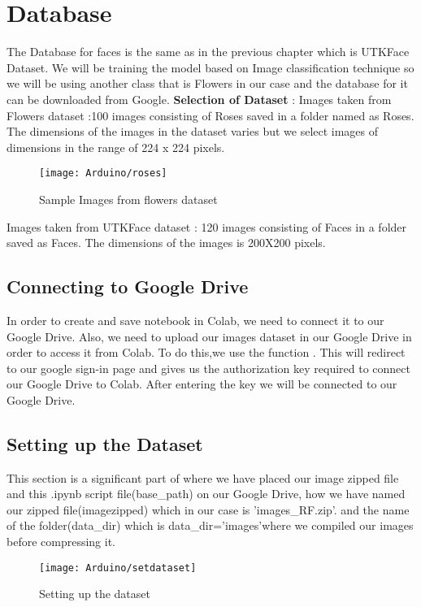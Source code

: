 	\section{Database}
	The Database for faces is the same as in the previous chapter which is UTKFace Dataset. We will be training the model based on Image classification technique so we will be using another class that is Flowers in our case and the database for it can be downloaded from Google.
	\textbf{Selection of Dataset} : Images taken from Flowers dataset :100 images consisting of Roses saved in a folder named as Roses. The dimensions of the images in the dataset varies but we select images of dimensions in the range of 224 x 224 pixels. 
	\begin{figure}[H]
		\centering
		\texttt{[image: Arduino/roses]}
		\caption{Sample Images from flowers dataset}
		\label{figure 10.1}
	\end{figure}
	Images taken from UTKFace dataset : 120 images consisting of Faces in a folder saved as Faces. The dimensions of the images is 200X200 pixels.
	\subsection{Connecting to Google Drive}
	In order to create and save notebook in Colab, we need to connect it to our Google Drive. Also, we need to upload our images dataset in our Google Drive in order to access it from Colab. To do this,we use the function . This will redirect to our google sign-in page and gives us the authorization key required to connect our Google Drive to Colab. After entering the key we will be connected to our Google Drive.
	
	
	
	\subsection{Setting up the Dataset}
	This section  is a significant part of where we have placed our image zipped file and this .ipynb script file(base\_path) on our Google Drive, how we have named our zipped file(imagezipped) which in our case is 'images\_RF.zip'. and the name of the folder(data\_dir) which is data\_dir='images'where we compiled our images before compressing it.
	\begin{figure}[H]
		\centering
		\texttt{[image: Arduino/setdataset]}
		\caption{Setting up the dataset}
		\label{figure 10.2}
	\end{figure}
